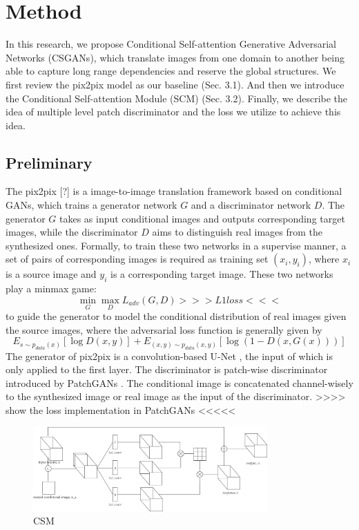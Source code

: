 \section{Method}
In this research, we propose Conditional Self-attention Generative Adversarial Networks (CSGANs), which translate images from one domain to another being able to capture long range dependencies and reserve the global structures. We first review the pix2pix model as our baseline (Sec. 3.1). And then we introduce the Conditional Self-attention Module (SCM) (Sec. 3.2). Finally, we describe the idea of multiple level patch discriminator and the loss we utilize to achieve this idea.
\subsection{Preliminary}
The pix2pix [?] is a image-to-image translation framework based on conditional GANs, which trains a generator network $G$ and a discriminator network $D$. The generator $G$ takes as input conditional images and outputs corresponding target images, while the discriminator $D$ aims to distinguish real images from the synthesized ones. Formally, to train these two networks in a supervise manner, a set of pairs of corresponding images is required as training set ${(x_i, y_i)}$, where $x_i$ is a source image and $y_i$ is a corresponding target image. These two networks play a minmax game:
\begin{equation}
\label{eqn:minmax_game}
\min_G \max_D L_{adv}(G,D) >>>L1 loss<<<
\end{equation}
to guide the generator to model the conditional distribution of real images given the source images, where the adversarial loss function is generally given by 
\begin{equation}
\label{eqn:loss_adv}
E_{s\sim p_{data}(x)}[\log D(x,y)]+E_{(x,y)\sim p_{data}(x,y)}[\log(1-D(x,G(x)))]
\end{equation}
The generator of pix2pix is a convolution-based U-Net \cite{Unet}, the input of which is only applied to the first layer. The discriminator is patch-wise discriminator introduced by PatchGANs \cite{PatchGANs}. The conditional image is concatenated channel-wisely to the synthesized image or real image as the input of the discriminator.
>>>> show the loss implementation in PatchGANs <<<<<
%
%
\begin{figure}
	\label{fig:CSM}
	\includegraphics[width=0.8\textwidth]{figures/CSM}
	\caption{CSM}
\end{figure}
%
%
